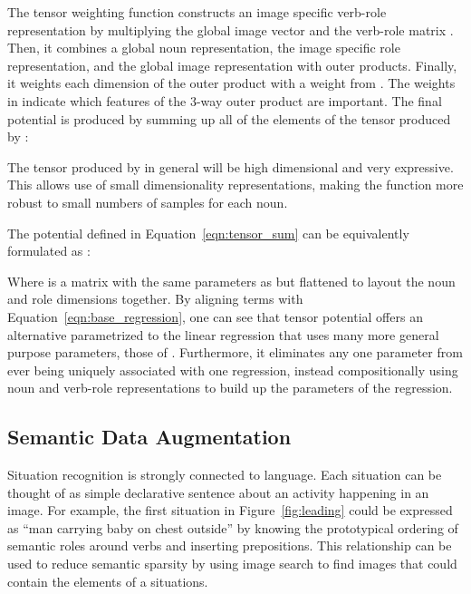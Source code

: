 \documentclass[10pt,twocolumn,letterpaper]{article}
\begin{document}
The tensor weighting function constructs an image specific verb-role representation by multiplying the global image vector and the verb-role matrix .  
Then, it combines a global noun representation, the image specific role representation, and the global image representation with outer products. 
Finally, it weights each dimension of the outer product with a weight from . 
The weights in  indicate which features of the 3-way outer product are important. 
The final potential is produced by summing up all of the elements of the tensor produced by :



The tensor produced by  in general will be high dimensional and very expressive.
This allows use of small dimensionality representations, making the function more robust to small numbers of samples for each noun.

The potential defined in Equation~\ref{eqn:tensor_sum} can be equivalently formulated as :

Where  is a matrix with the same parameters as  but flattened to layout the noun and role dimensions together. 
By aligning terms with Equation~\ref{eqn:base_regression}, one can see that tensor potential offers an alternative parametrized to the linear regression that uses many more general purpose parameters, those of .
Furthermore, it eliminates any one parameter from ever being uniquely associated with one regression, instead compositionally using noun and verb-role representations to build up the parameters of the regression. \subsection{Semantic Data Augmentation}
Situation recognition is strongly connected to language. 
Each situation can be thought of as simple declarative sentence about an activity happening in an image. 
For example, the first situation in Figure~\ref{fig:leading} could be expressed as ``man carrying baby on chest outside'' by knowing the prototypical ordering of semantic roles around verbs and inserting prepositions.
This relationship can be used to reduce semantic sparsity by using image search to find images that could contain the elements of a situations.
\end{document}
